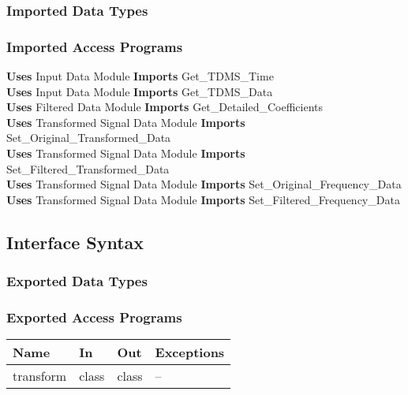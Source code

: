 \documentclass[12pt]{article}
\begin{document}
\subsubsection{Imported Data Types}

\subsubsection{Imported Access Programs}
\textbf{Uses} Input Data Module \textbf{Imports} Get\_TDMS\_Time\\
\textbf{Uses} Input Data Module \textbf{Imports} Get\_TDMS\_Data\\
\textbf{Uses} Filtered Data Module \textbf{Imports} 
Get\_Detailed\_Coefficients\\
\textbf{Uses} Transformed Signal Data Module \textbf{Imports} 
Set\_Original\_Transformed\_Data\\
\textbf{Uses} Transformed Signal Data Module \textbf{Imports} 
Set\_Filtered\_Transformed\_Data\\
\textbf{Uses} Transformed Signal Data Module \textbf{Imports} 
Set\_Original\_Frequency\_Data\\
\textbf{Uses} Transformed Signal Data Module \textbf{Imports} 
Set\_Filtered\_Frequency\_Data

\subsection{Interface Syntax}
\subsubsection{Exported Data Types}

\subsubsection{Exported Access Programs}

\begin{center}
\begin{tabular}{l l l l}
\hline
\textbf{Name} & \textbf{In} & \textbf{Out} & \textbf{Exceptions} \\ \hline
transform & class & class 
& --\\
\hline
\end{tabular}
\end{center}
\end{document}

